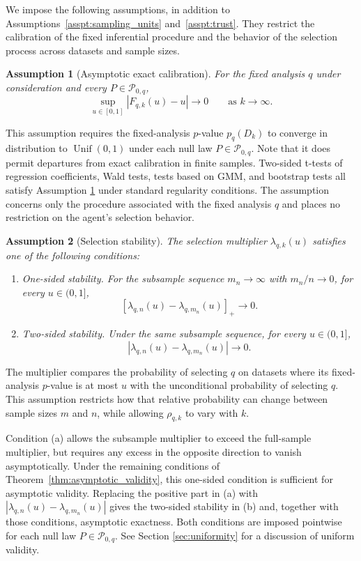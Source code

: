 \documentclass[10pt]{article}
\newtheorem{assumption}{Assumption}
\begin{document}
We impose the following assumptions, in addition to Assumptions~\ref{asspt:sampling_units} and~\ref{asspt:trust}.
They restrict the calibration of the fixed inferential procedure and the behavior of the selection process across datasets and sample sizes.

\begin{assumption}[Asymptotic exact calibration]
\label{asspt:base_calibration}
For the fixed analysis $q$ under consideration and every $P\in\mathcal P_{0,q}$,
\[
\sup_{u\in[0,1]}
\left|F_{q,k}(u)-u\right|
\longrightarrow 0
\qquad\text{as } k\to\infty.
\]
\end{assumption}

This assumption requires the fixed-analysis $p$-value $p_q(D_k)$ to converge in distribution to $\operatorname{Unif}(0,1)$ under each null law $P\in\mathcal P_{0,q}$. Note that it does permit departures from exact calibration in finite samples. Two-sided t-tests of regression coefficients, Wald tests, tests based on GMM, and bootstrap tests all satisfy Assumption \ref{asspt:base_calibration} under standard regularity conditions. The assumption concerns only the procedure associated with the fixed analysis $q$ and places no restriction on the agent's selection behavior.

\begin{assumption}[Selection stability]
\label{asspt:lambda_stability}
The selection multiplier $\lambda_{q,k}(u)$ satisfies one of the following conditions:
\begin{enumerate}[label=(\alph*)]
\item \textit{One-sided stability.}
For the subsample sequence $m_n\to\infty$
with $m_n/n\to0$, for every $u\in(0,1]$,
\[
\left[\lambda_{q,n}(u)
-\lambda_{q,m_n}(u)\right]_+
\longrightarrow0.
\]

\item \textit{Two-sided stability.}
Under the same subsample sequence, for every
$u\in(0,1]$,
\[
\left|\lambda_{q,n}(u)
-\lambda_{q,m_n}(u)\right|
\longrightarrow0.
\]
\end{enumerate}
\end{assumption}

The multiplier compares the probability of selecting $q$ on datasets where its fixed-analysis $p$-value is at most $u$ with the unconditional probability of selecting $q$. This assumption restricts how that relative probability can change between sample sizes $m$ and $n$, while allowing $\rho_{q,k}$ to vary with $k$.

Condition (a) allows the subsample multiplier to exceed the full-sample multiplier, but requires any excess in the opposite direction to vanish asymptotically.
Under the remaining conditions of Theorem~\ref{thm:asymptotic_validity}, this one-sided condition is sufficient for asymptotic validity. Replacing the positive part in (a) with $|\lambda_{q,n}(u)-\lambda_{q,m_n}(u)|$ gives the two-sided stability in (b) and, together with those conditions, asymptotic exactness. Both conditions are imposed pointwise for each null law $P\in \mathcal{P}_{0,q}$. See Section \ref{sec:uniformity} for a discussion of uniform validity.
\end{document}

